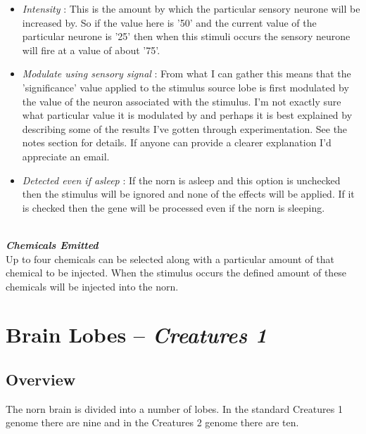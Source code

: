 \documentclass[11pt,twoside,a4paper]{article}
\begin{document}
\begin{itemize}
\item[] \emph{Intensity} : This is the amount by which the particular sensory neurone will be increased by. So if the value here is '50' and the current value of the particular neurone is '25' then when this stimuli occurs the sensory neurone will fire at a value of about '75'.
\item[] \emph{Modulate using sensory signal} : From what I can gather this means that the 'significance' value applied to the stimulus source lobe is first modulated by the value of the neuron associated with the stimulus. I'm not exactly sure what particular value it is modulated by and perhaps it is best explained by describing some of the results I've gotten through experimentation. See the notes section for details. If anyone can provide a clearer explanation I'd appreciate an email.
\item[] \emph{Detected even if asleep} : If the norn is asleep and this option is unchecked then the stimulus will be ignored and none of the effects will be applied. If it is checked then the gene will be processed even if the norn is sleeping.
\end{itemize}~\\

\textbf{\textit{Chemicals Emitted}}~\\
Up to four chemicals can be selected along with a particular amount of that chemical to be injected. When the stimulus occurs the defined amount of these chemicals will be injected into the norn.

\clearpage


\section{Brain Lobes -- \textit{Creatures 1}} %


\subsection{Overview}

The norn brain is divided into a number of lobes. In the standard Creatures 1 genome there are nine and in the Creatures 2 genome there are ten.~\\
\end{document}
